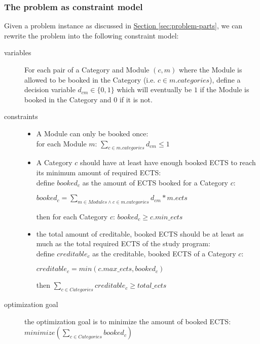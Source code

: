 \documentclass[a4paper]{article}
\begin{document}
\subsubsection{The problem as constraint model}
\label{sec:constraint-model}
Given a problem instance as discussed in
\hyperref[sec:problem-parts]{Section \ref*{sec:problem-parts}}, 
we can rewrite the problem into the following constraint model:
\begin{description}
\item[variables]
	For each pair of a Category and Module $(c,m)$ where the Module is allowed to be booked in the Category (i.e. $c\in m.categories$), define a decision variable $d_{cm}\in\{0,1\}$ which will eventually be $1$ if the Module is booked in the Category and $0$ if it is not.

\item[constraints]\hspace*{1em}
\begin{itemize}
	\item
	A Module can only be booked once:  
	\\for each Module $m$: $\sum_{c\in m.categories}d_{cm}\leq 1$

	\item
	A Category $c$ should have at least have enough booked ECTS to reach its minimum amount of required ECTS:
	\\ define $booked_c$ as the amount of ECTS booked for a Category $c$:
	
	$booked_c=\sum_{m\in Modules\wedge c\in m.categories} d_{cm}*m.ects$

	then for each Category $c$: $booked_c \geq c.min\_ects$

	\item the total amount of creditable, booked ECTS should be at least as much as the total required ECTS of the study program:
	\\define $creditable_c$ as the creditable, booked ECTS of a Category $c$:
	
	$creditable_c=min(c.max\_ects, booked_c)$

	then $\sum_{c\in Categories}creditable_c  \geq total\_ects$
\end{itemize}

\item[optimization goal]
	the optimization goal is to minimize the amount of booked ECTS:
	 $minimize(\sum_{c\in Categories}booked_c)$
\end{description}

\end{document}
